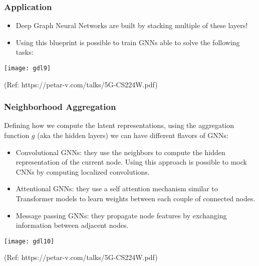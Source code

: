\begin{frame}[fragile]\frametitle{Application}


\begin{itemize}
\item Deep Graph Neural Networks are built by stacking multiple of these layers!
\item Using this blueprint is possible to train GNNs able to solve the following tasks:
\end{itemize}
	
\begin{center}
\texttt{[image: gdl9]}
\end{center}

{\tiny (Ref: https://petar-v.com/talks/5G-CS224W.pdf)}	

\end{frame}


\begin{frame}[fragile]\frametitle{Neighborhood Aggregation}

Defining how we compute the latent representations, using the aggregation function $g$ (aka the hidden layers) we can have different flavors of GNNs:

\begin{itemize}
\item Convolutional GNNs: they use the neighbors to compute the hidden representation of the current node. Using this approach is possible to mock CNNs by computing localized convolutions.
\item Attentional GNNs: they use a self attention mechanism similar to Transformer models to learn weights between each couple of connected nodes.
\item Message passing GNNs: they propagate node features by exchanging information between adjacent nodes.
\end{itemize}
	
\begin{center}
\texttt{[image: gdl10]}
\end{center}

{\tiny (Ref: https://petar-v.com/talks/5G-CS224W.pdf)}	

\end{frame}

